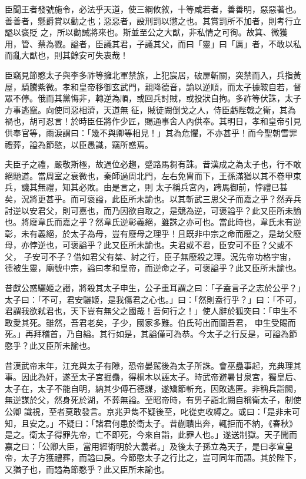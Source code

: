 \begin{pinyinscope}
 臣聞王者發號施令，必法乎天道，使三綱攸敘，十等咸若者，善善明，惡惡著也。善善者，懸爵賞以勸之也；惡惡者，設刑罰以懲之也。其賞罰所不加者，則考行立謚以褒貶
 之，所以勸誡將來也。斯並至公之大猷，非私情之可徇。故箕、微獲用，管、蔡為戮。謚者，臣議其君，子議其父，而曰「靈」曰「厲」者，不敢以私而亂大猷也，則其餘安可失衷哉！



 臣竊見節愍太子與李多祚等擁北軍禁旅，上犯宸居，破扉斬關，突禁而入，兵指黃屋，騎騰紫微。孝和皇帝移御玄武門，親降德音，諭以逆順，而太子據鞍自若，督眾不停。俄而其黨悔非，轉逆為順，或回兵討賊，或投狀自拘。多祚等伏誅，太子方事逃竄。向使同惡相濟，天道無
 征，賊徒闕倒戈之人，侍臣虧陛戟之衛，其為禍也，胡可忍言！於時臣任將作少匠，賜通事舍人內供奉。其明日，孝和皇帝引見供奉官等，雨淚謂曰：「幾不與卿等相見！」其為危懼，不亦甚乎！而今聖朝雪罪禮葬，謚為節愍，以臣愚識，竊所惑焉。



 夫臣子之禮，嚴敬斯極，故過位必趨，蹙路馬芻有誅。昔漢成之為太子也，行不敢絕馳道。當周室之衰微也，秦師過周北門，左右免胄而下，王孫滿猶以其不卷甲束兵，譏其無禮，知其必敗。由是言之，則
 太子稱兵宮內，跨馬御前，悖禮已甚矣，況將更甚乎。而可褒謚，此臣所未諭也。以其斬武三思父子而嘉之乎？然弄兵討逆以安君父，則可嘉也，而乃因欲自取之，是競為逆，可褒謚乎？此又臣所未諭也。將廢韋氏而嘉之乎？然韋氏逆彰義絕，雖誅之亦可也。當此時也，韋氏未有逆彰，未有義絕，於太子為母，豈有廢母之理乎！且既非中宗之命而廢之，是劫父廢母，亦悖逆也，可褒謚乎？此又臣所未諭也。夫君或不君，臣安可不臣？父或不父，
 子安可不子？借如君父有桀、紂之行，臣子無廢殺之理。況先帝功格宇宙，德被生靈，廟號中宗，謚曰孝和皇帝，而逆命之子，可褒謚乎？此又臣所未諭也。



 昔獻公惑驪姬之譖，將殺其太子申生，公子重耳謂之曰：「子盍言子之志於公乎？」太子曰：「不可，君安驪姬，是我傷君之心也。」曰：「然則盍行乎？」曰：「不可，君謂我欲弒君也，天下豈有無父之國哉！吾何行之！」使人辭於狐突曰：「申生不敢愛其死。雖然，吾君老矣，子少，國家多難。伯氏茍出而圖吾君，
 申生受賜而死。」再拜稽首，乃自縊。其行如是，其謚僅可為恭。今太子之行反是，可謚為節愍乎？此又臣所未諭也。



 昔漢武帝末年，江充與太子有隙，恐帝晏駕後為太子所誅。會巫蠱事起，充典理其事。因此為奸，遂至太子宮掘蠱，得桐木以誣太子。時武帝避暑甘泉宮，獨皇后、太子在，太子不能自明，納其少傅石德謀，遂矯節斬充，因敗逃匿。非稱兵詣闕，無逆謀於父，然身死於湖，不葬無謚。至昭帝時，有男子詣北闕自稱衛太子，制使公卿
 識視，至者莫敢發言。京兆尹雋不疑後至，叱從吏收縛之。或曰：「是非未可知，且安之。」不疑曰：「諸君何患於衛太子。昔蒯聵出奔，輒拒而不納，《春秋》是之。衛太子得罪先帝，亡不即死，今來自詣，此罪人也。」遂送制獄。天子聞而嘉之曰：「公卿大臣，當用經術明於大義者。」及後太子孫立為天子，是曰孝宣皇帝，太子方獲禮葬，而謚曰戾。今節愍太子之行比之，豈可同年而語。其於陛下，又猶子也，而謚為節愍乎？此又臣所未諭也。




\end{pinyinscope}
